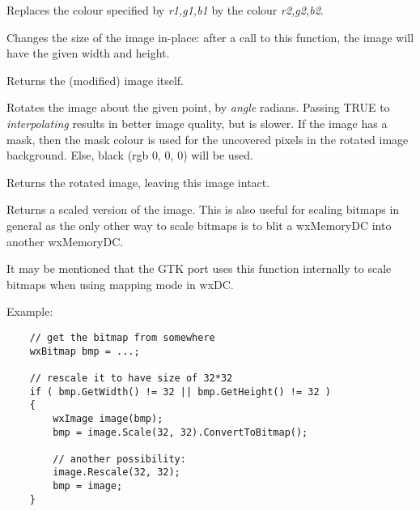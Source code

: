 \label{wximagereplace}


Replaces the colour specified by {\it r1,g1,b1} by the colour {\it r2,g2,b2}.

\label{wximagerescale}


Changes the size of the image in-place: after a call to this function, the
image will have the given width and height.

Returns the (modified) image itself.



\label{wximagerotate}


Rotates the image about the given point, by {\it angle} radians. Passing TRUE
to {\it interpolating} results in better image quality, but is slower. If the
image has a mask, then the mask colour is used for the uncovered pixels in the
rotated image background. Else, black (rgb 0, 0, 0) will be used.

Returns the rotated image, leaving this image intact.

\label{wximagescale}


Returns a scaled version of the image. This is also useful for
scaling bitmaps in general as the only other way to scale bitmaps
is to blit a wxMemoryDC into another wxMemoryDC.

It may be mentioned that the GTK port uses this function internally
to scale bitmaps when using mapping mode in wxDC. 

Example:

\begin{verbatim}
    // get the bitmap from somewhere
    wxBitmap bmp = ...;

    // rescale it to have size of 32*32
    if ( bmp.GetWidth() != 32 || bmp.GetHeight() != 32 )
    {
        wxImage image(bmp);
        bmp = image.Scale(32, 32).ConvertToBitmap();

        // another possibility:
        image.Rescale(32, 32);
        bmp = image;
    }

\end{verbatim}

